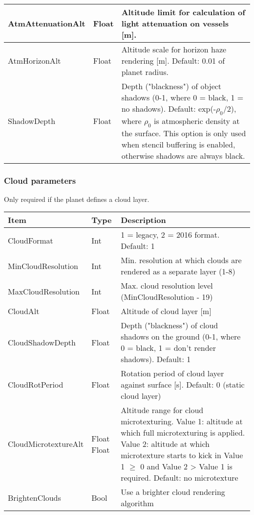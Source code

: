 \documentclass[Orbiter Developer Manual.tex]{subfiles}
\begin{document}
\begin{longtable}{ |p{}|p{}|p{}| }
	\hline\rule{0pt}{2ex}
	AtmAttenuationAlt & Float & Altitude limit for calculation of light attenuation on vessels [m].\\
	\hline\rule{0pt}{2ex}
	AtmHorizonAlt & Float & Altitude scale for horizon haze rendering [m]. Default: 0.01 of planet radius.\\
	\hline\rule{0pt}{2ex}
	ShadowDepth & Float & Depth ("blackness") of object shadows (0-1, where 0 = black, 1 = no shadows). Default: exp(-$\rho_{0}$/2), where $\rho_{0}$ is atmospheric density at the surface. This option is only used when stencil buffering is enabled, otherwise shadows are always black.\\
	\hline
	\end{longtable}


\subsubsection*{Cloud parameters}
Only required if the planet defines a cloud layer.

	\begin{longtable}{ |p{}|p{}|p{}| }
	\hline\rule{0pt}{2ex}
	\textbf{Item} & \textbf{Type} & \textbf{Description}\\
	\hline\rule{0pt}{2ex}
	CloudFormat & Int & 1 = legacy, 2 = 2016 format. Default: 1\\
	\hline\rule{0pt}{2ex}
	MinCloudResolution & Int & Min. resolution at which clouds are rendered as a separate layer (1-8)\\
	\hline\rule{0pt}{2ex}
	MaxCloudResolution & Int & Max. cloud resolution level (MinCloudResolution - 19)\\
	\hline\rule{0pt}{2ex}
	CloudAlt & Float & Altitude of cloud layer [m]\\
	\hline\rule{0pt}{2ex}
	CloudShadowDepth & Float & Depth ("blackness") of cloud shadows on the ground (0-1, where 0 = black, 1 = don't render shadows). Default: 1\\
	\hline\rule{0pt}{2ex}
	CloudRotPeriod & Float & Rotation period of cloud layer against surface [s]. Default: 0 (static cloud layer)\\
	\hline\rule{0pt}{2ex}
	CloudMicrotextureAlt & Float Float & Altitude range for cloud microtexturing.\newline
	Value 1: altitude at which full microtexturing is applied.\newline
	Value 2: altitude at which microtexture starts to kick in\newline
	Value 1 $\geq$ 0 and Value 2 > Value 1 is required. Default: no microtexture\\
	\hline\rule{0pt}{2ex}
	BrightenClouds & Bool & Use a brighter cloud rendering algorithm\\
	\hline
	\end{longtable}
\end{document}
